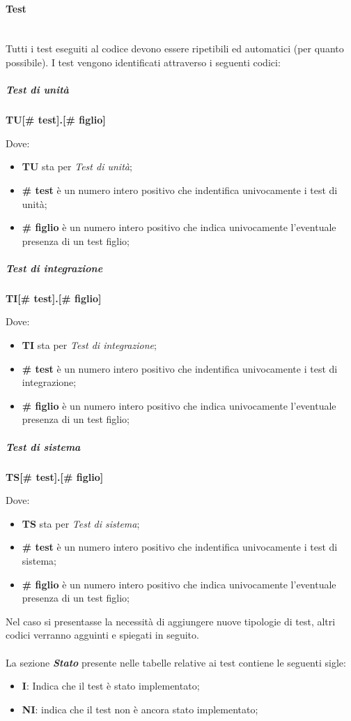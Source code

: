 \paragraph{Test}
\mbox{}\\
Tutti i test eseguiti al codice devono essere ripetibili ed automatici (per quanto possibile).
I test vengono identificati attraverso i seguenti codici:
\subparagraph{Test di unità}
\begin{center}
    \textbf{TU[\# test].[\# figlio]}
\end{center}
Dove:
\begin{itemize}
    \item \textbf{TU} sta per \textit{Test di unità};
    \item \textbf{\# test} è un numero intero positivo che indentifica univocamente i test di unità;
    \item \textbf{\# figlio} è un numero intero positivo che indica univocamente l'eventuale presenza di un test figlio;
\end{itemize}

\subparagraph{Test di integrazione}
\begin{center}
    \textbf{TI[\# test].[\# figlio]}
\end{center}
Dove:
\begin{itemize}
    \item \textbf{TI} sta per \textit{Test di integrazione};
    \item \textbf{\# test} è un numero intero positivo che indentifica univocamente i test di integrazione;
    \item \textbf{\# figlio} è un numero intero positivo che indica univocamente l'eventuale presenza di un test figlio;
\end{itemize}

\subparagraph{Test di sistema}
\begin{center}
    \textbf{TS[\# test].[\# figlio]}
\end{center}
Dove:
\begin{itemize}
    \item \textbf{TS} sta per \textit{Test di sistema};
    \item \textbf{\# test} è un numero intero positivo che indentifica univocamente i test di sistema;
    \item \textbf{\# figlio} è un numero intero positivo che indica univocamente l'eventuale presenza di un test figlio;
\end{itemize}
Nel caso si presentasse la necessità di aggiungere nuove tipologie di test, altri codici verranno agguinti e spiegati in seguito.\\\\
La sezione \textbf{\textit{Stato}} presente nelle tabelle relative ai test contiene le seguenti sigle:
\begin{itemize}
    \item \textbf{I}: Indica che il test è stato implementato;
    \item \textbf{NI}: indica che il test non è ancora stato implementato;
\end{itemize}

